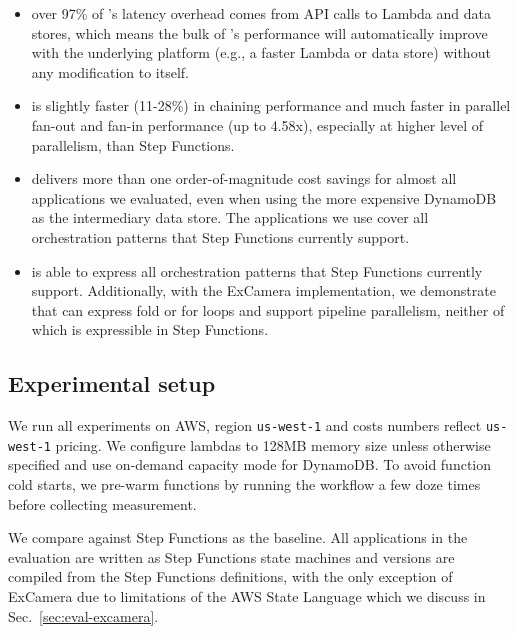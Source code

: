\begin{itemize}

    \item over 97\% of \name{}'s latency overhead comes from API calls to
    Lambda and data stores, which means the bulk of \name{}'s performance will
    automatically improve with the underlying platform (e.g., a faster Lambda
    or data store) without any modification to \name{} itself.


    \item \name{} is slightly faster (11-28\%) in chaining performance and
    much faster in parallel fan-out and fan-in performance (up to 4.58x),
    especially at higher level of parallelism, than Step Functions.

    \item \name{} delivers more than one order-of-magnitude cost savings for
    almost all applications we evaluated, even when using the more expensive
    DynamoDB as the intermediary data store. The applications we use cover all
    orchestration patterns that Step Functions currently support.

    \item \name{} is able to express all orchestration patterns that Step
    Functions currently support. Additionally, with the ExCamera
    implementation, we demonstrate that \name{} can express fold or for loops
    and support pipeline parallelism, neither of which is expressible in Step
    Functions.

\end{itemize}

\subsection{Experimental setup}

We run all experiments on AWS, region \texttt{us-west-1} and costs numbers
reflect \texttt{us-west-1} pricing. We configure lambdas to 128MB memory size
unless otherwise specified and use on-demand capacity mode for DynamoDB. To
avoid function cold starts, we pre-warm functions by running the workflow a
few doze times before collecting measurement.


We compare against Step Functions as the baseline. All applications in the
evaluation are written as Step Functions state machines and \name{} versions
are compiled from the Step Functions definitions, with the only exception of
ExCamera due to limitations of the AWS State Language which we discuss in
Sec.~\ref{sec:eval-excamera}.


